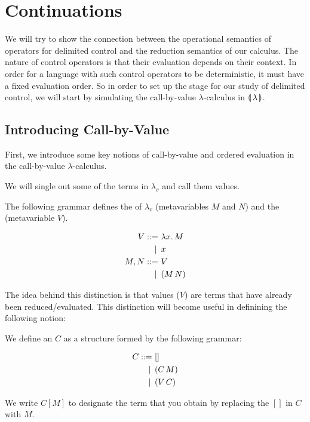 \chapter{Continuations}
\label{chap:continuations}

We will try to show the connection between the operational semantics of
operators for delimited control and the reduction semantics of our
calculus. The nature of control operators is that their evaluation depends
on their context. In order for a language with such control operators to be
deterministic, it must have a fixed evaluation order. So in order to set up
the stage for our study of delimited control, we will start by simulating
the call-by-value $\lambda$-calculus in $\llparenthesis \, \lambda \, \rrparenthesis$.


\minitoc

\section{Introducing Call-by-Value}

First, we introduce some key notions of call-by-value and ordered
evaluation in the call-by-value $\lambda$-calculus.

We will single out some of the terms in $\lambda_v$ and call them values.

\begin{definition}
  The following grammar defines the  of $\lambda_v$
  (metavariables $M$ and $N$) and the  (metavariable $V$).

\begin{align*}
  V ::= &\ \lambda x.\, M \\
   | \, &\ x \\
  M, N ::= &\ V \\
   | \, &\ (M\,N)
\end{align*}
\end{definition}

The idea behind this distinction is that values ($V$) are terms that have
already been reduced/evaluated. This distinction will become useful in
definining the following notion:

\begin{definition}
  We define an  $C$ as a structure formed by the
  following grammar:

\begin{align*}
  C ::= &\ [] \\
  | \, &\ (C\,M) \\
  | \, &\ (V\,C)
\end{align*}

  We write $C[M]$ to designate the term that you obtain by replacing the
  $[]$ in $C$ with $M$.
\end{definition}

